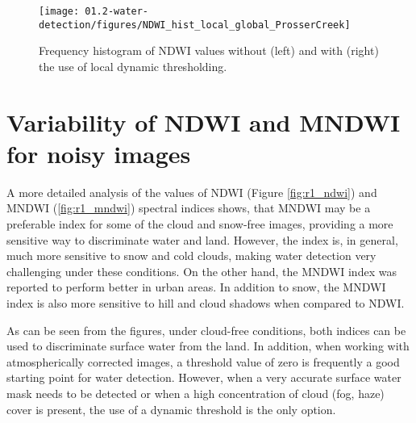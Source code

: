 \begin{figure}[H]
	\centering
	\texttt{[image: 01.2-water-detection/figures/NDWI\_hist\_local\_global\_ProsserCreek]}
	\caption{Frequency histogram of \gls{NDWI} values without (left) and with (right) the use of local dynamic thresholding.}
	\label{fig:water_detection_method_local_water_hist_PC}
\end{figure}

\section{Variability of NDWI and MNDWI for noisy images}

A more detailed analysis of the values of \gls{NDWI} (Figure \ref{fig:r1_ndwi}) and \gls{MNDWI} (\ref{fig:r1_mndwi}) spectral indices shows, that \gls{MNDWI} may be a preferable index for some of the cloud and snow-free images, providing a more sensitive way to discriminate water and land. However, the index is, in general, much more sensitive to snow and cold clouds, making water detection very challenging under these conditions. On the other hand, the \gls{MNDWI} index was reported to perform better in urban areas. In addition to snow, the \gls{MNDWI} index is also more sensitive to hill and cloud shadows when compared to \gls{NDWI}. 


As can be seen from the figures, under cloud-free conditions, both indices can be used to discriminate surface water from the land. In addition, when working with atmospherically corrected images, a threshold value of zero is frequently a good starting point for water detection. However, when a very accurate surface water mask needs to be detected or when a high concentration of cloud (fog, haze) cover is present, the use of a dynamic threshold is the only option.

